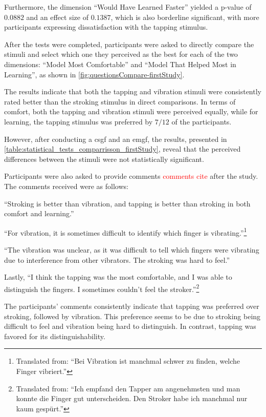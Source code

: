 Furthermore, the dimension \enquote{Would Have Learned Faster} yielded a p-value of $0.0882$ and an effect size of $0.1387$, which is also borderline significant, with more participants expressing dissatisfaction with the tapping stimulus.

After the tests were completed, participants were asked to directly compare the stimuli and select which one they perceived as the best for each of the two dimensions: \enquote{Model Most Comfortable} and \enquote{Model That Helped Most in Learning}, as shown in \autoref{fig:questionsCompare-firstStudy}. 

The results indicate that both the tapping and vibration stimuli were consistently rated better than the stroking stimulus in direct comparisons. In terms of comfort, both the tapping and vibration stimuli were perceived equally, while for learning, the tapping stimulus was preferred by $7/12$ of the participants. 

However, after conducting a \gls{csgf} and an \gls{emgf}, the results, presented in \autoref{table:statistical_tests_comparrisson_firstStudy}, reveal that the perceived differences between the stimuli were not statistically significant.


Participants were also asked to provide comments \textcolor{red}{comments cite} after the study. The comments received were as follows:

\enquote{Stroking is better than vibration, and tapping is better than stroking in both comfort and learning.}

\enquote{For vibration, it is sometimes difficult to identify which finger is vibrating.}\footnote{Translated from: \enquote{Bei Vibration ist manchmal schwer zu finden, welche Finger vibriert.}}

\enquote{The vibration was unclear, as it was difficult to tell which fingers were vibrating due to interference from other vibrators. The stroking was hard to feel.}

Lastly, \enquote{I think the tapping was the most comfortable, and I was able to distinguish the fingers. I sometimes couldn’t feel the stroker.}\footnote{Translated from: \enquote{Ich empfand den Tapper am angenehmsten und man konnte die Finger gut unterscheiden. Den Stroker habe ich manchmal nur kaum gespürt.}}

The participants' comments consistently indicate that tapping was preferred over stroking, followed by vibration. This preference seems to be due to stroking being difficult to feel and vibration being hard to distinguish. In contrast, tapping was favored for its distinguishability.


